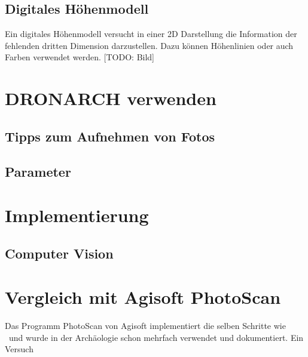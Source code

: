 		\section{Digitales Höhenmodell} \label{app:dtm}
			Ein digitales Höhenmodell versucht in einer 2D Darstellung die Information der fehlenden dritten Dimension darzustellen. Dazu können Höhenlinien oder auch Farben verwendet werden.
			[TODO: Bild]
			
\chapter{DRONARCH verwenden}
	\section{Tipps zum Aufnehmen von Fotos}\label{app:tip_foto}
	\section{Parameter}\label{app:param}
	
\chapter{Implementierung} \label{app:imp}
	\section{Computer Vision} \label{app:imp:comp_vis}
	
\chapter{Vergleich mit Agisoft PhotoScan}\label{app:photoscan}
	Das Programm PhotoScan von Agisoft implementiert die selben Schritte wie \dronarch\ und wurde in der Archäologie schon mehrfach verwendet und dokumentiert. Ein Versuch 
	